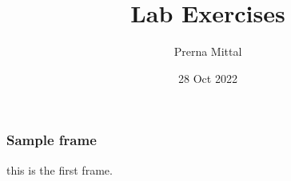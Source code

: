 \documentclass{beamer}
\title{Lab Exercises}
\author{Prerna Mittal}
\date{28 Oct 2022}
\begin{document}
\frame{\titlepage}
\begin{frame}
    \frametitle{Sample frame}
    this is the first frame.
\end{frame}
\end{document}
